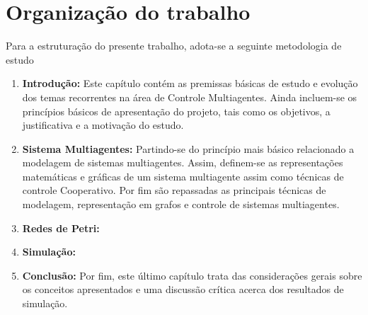 \begin{comment}   
\section{Justificativa}
\end{comment}

\begin{comment}   
 \section{Motivação}
A abordagem .... 
\end{comment}

\begin{comment}   
\section{Produção científica}
Ao longo do desenvolvimento desta dissertação, foram publicados ou submetidos a
congressos ou periódicos os seguintes artigos:
\begin{itemize}
    \item PAIVA, Davi Alexandre et al. A simple procedure for modeling and identification of a test bench 4-DOF manipulator. In: Congresso Brasileiro de Automática-CBA. 2020.
\end{itemize}
\end{comment}

\section{Organização do trabalho}
Para a estruturação do presente trabalho, adota-se a seguinte metodologia de estudo

\begin{enumerate}
\item 
\textbf{Introdução:} Este capítulo contém as premissas básicas de estudo e evolução dos temas recorrentes na área de Controle Multiagentes. Ainda incluem-se os princípios básicos de apresentação do projeto, tais como os objetivos, a justificativa e a motivação do estudo.

\item \textbf{Sistema Multiagentes: } Partindo-se do princípio mais básico relacionado a modelagem de sistemas multiagentes. Assim, definem-se as representações matemáticas e gráficas de um sistema multiagente assim como técnicas de controle Cooperativo. Por fim são repassadas as principais técnicas de modelagem, representação em grafos e controle de sistemas multiagentes. 
    
\item \textbf{Redes de Petri: } 
    
\item \textbf{Simulação:} 
    
\item \textbf{Conclusão:} Por fim, este último capítulo trata das considerações gerais sobre os conceitos apresentados e uma discussão crítica acerca dos resultados de simulação.

\end{enumerate}

	
